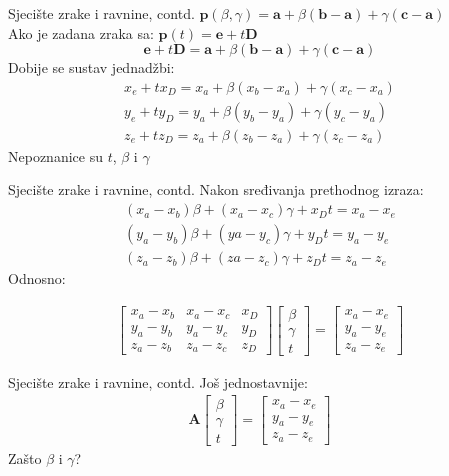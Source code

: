 \documentclass[9pt]{beamer}
\begin{document}
\begin{frame}{Sjecište zrake i ravnine, contd.}
	$\textbf{p}(\beta, \gamma) = \textbf{a} + \beta(\textbf{b}-\textbf{a}) + \gamma(\textbf{c}-\textbf{a})$ 
	\\
	Ako je zadana zraka sa: $\textbf{p}(t) = \textbf{e}+t\textbf{D}$
	$$\textbf{e}+t\textbf{D} = \textbf{a} + \beta(\textbf{b}-\textbf{a}) + \gamma(\textbf{c}-\textbf{a})$$
	Dobije se sustav jednadžbi:
	\begin{align*}
	x_e+tx_D = x_a + \beta(x_b-x_a) + \gamma(x_c-x_a)\\
	y_e+ty_D = y_a + \beta(y_b-y_a) + \gamma(y_c-y_a)\\
	z_e+tz_D = z_a + \beta(z_b-z_a) + \gamma(z_c-z_a)
	\end{align*}
	Nepoznanice su $t$, $\beta$ i $\gamma$
\end{frame}	

\begin{frame}{Sjecište zrake i ravnine, contd.}
	Nakon sređivanja prethodnog izraza:
	\begin{align*}
	(x_a-x_b)\beta + (x_a-x_c)\gamma + x_Dt=x_a-x_e\\
	(y_a-y_b)\beta + (ya-y_c)\gamma + y_Dt=y_a-y_e\\
	(z_a-z_b)\beta + (za-z_c)\gamma + z_Dt=z_a-z_e
	\end{align*}
	Odnosno:
	
	\begin{align*}
	\left[
	\begin{array}{ccc}
	x_a-x_b&  x_a-x_c&  x_D \\ 
	y_a-y_b&  y_a-y_c&  y_D  \\ 
	z_a-z_b&  z_a-z_c&  z_D
	\end{array} 
	\right]
	\left[
	\begin{array}{c}
	\beta \\ \gamma \\ t
	\end{array} 
	\right] =
	\left[
	\begin{array}{c}
	x_a-x_e \\ y_a-y_e \\ z_a-z_e
	\end{array} 
	\right]
	\end{align*}
\end{frame}	

\begin{frame}{Sjecište zrake i ravnine, contd.}
	Još jednostavnije:
	\begin{align*}
	\textbf{A}
	\left[
	\begin{array}{c}
	\beta \\ \gamma \\ t
	\end{array} 
	\right] =
	\left[
	\begin{array}{c}
	x_a-x_e \\ y_a-y_e \\ z_a-z_e
	\end{array} 
	\right]
	\end{align*}
	Zašto $\beta$ i $\gamma$?
\end{frame}
\end{document}

